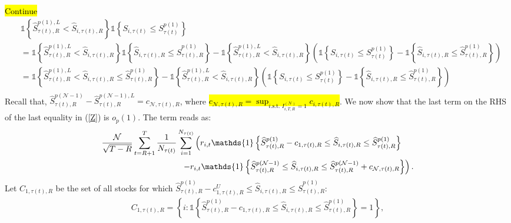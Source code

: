 \hl{Continue}
\begin{align*}
    &\mathds{1} \left\{  \widehat{S}_{\tau(t),R}^{p(1),L} < \widehat{S}_{i,\tau(t),R} \right\} \mathds{1} \left\{ S_{i,\tau(t)}\leq S_{\tau(t)}^{p(1)}\right\} \\
    &=\mathds{1} \left\{  \widehat{S}_{\tau(t),R}^{p(1),L} < \widehat{S}_{i,\tau(t),R} \right\} \mathds{1} \left\{ \widehat{S}_{i,\tau(t),R}\leq \widehat{S}_{\tau(t),R}^{p(1)}\right\} - \mathds{1} \left\{  \widehat{S}_{\tau(t),R}^{p(1),L} < \widehat{S}_{i,\tau(t),R} \right\} \left( \mathds{1} \left\{ S_{i,\tau(t)}\leq S_{\tau(t)}^{p(1)}\right\} - \mathds{1} \left\{ \widehat{S}_{i,\tau(t),R}\leq \widehat{S}_{\tau(t),R}^{p(1)}\right\} \right) \\
    &=\mathds{1} \left\{  \widehat{S}_{\tau(t),R}^{p(1),L} < \widehat{S}_{i,\tau(t),R} \leq \widehat{S}_{\tau(t),R}^{p(1)}\right\} - \mathds{1} \left\{  \widehat{S}_{\tau(t),R}^{p(1),L} < \widehat{S}_{i,\tau(t),R} \right\} \left( \mathds{1} \left\{ S_{i,\tau(t)}\leq S_{\tau(t)}^{p(1)}\right\} - \mathds{1} \left\{ \widehat{S}_{i,\tau(t),R}\leq \widehat{S}_{\tau(t),R}^{p(1)}\right\} \right) \\
\end{align*}
Recall that, $\widehat{S}_{\tau(t),R}^{p(\mathcal{N}-1)}-\widehat{S}_{\tau(t),R}^{p(\mathcal{N}-1),L}=c_{\mathcal{N},\tau(t),R}$, where \hl{$c_{\mathcal{N},\tau(t),R}=\sup_{i\text{.s.t. }I_{i,T,R}^{(\mathcal{N})}=1}c_{i,\tau(t),R}$}. We now show that the last term on the RHS of the last equality in (\ref{Z}) is $o_{p}(1).$ The term reads as:
\begin{align*}
    &\frac{\mathcal{N}}{\sqrt{T-R}}\sum_{t=R+1}^{T}\frac{1}{N_{\tau(t)}}\sum_{i=1}^{N_{\tau(t)}}\left( r_{i,t}\mathds{1} \left\{ \widehat{S}_{\tau(t),R}^{p(1)}-c_{1,\tau(t),R} \leq \widehat{S}_{i,\tau(t),R}\leq \widehat{S}_{\tau(t),R}^{p(1)}\right\} \right. \notag \\
    &\hspace{3.4cm} \left. -r_{i,t}\mathds{1} \left\{ \widehat{S}_{\tau(t),R}^{p(\mathcal{N}-1)} \leq \widehat{S}_{i,\tau(t),R}\leq \widehat{S}_{\tau(t),R}^{p(\mathcal{N}-1)}+c_{\mathcal{N},\tau(t),R} \right\} \right). \label{BTNR}
\end{align*}
Let $C_{1,\tau(t),R}$ be the set of all stocks for which $\widehat{S}_{\tau(t),R}^{p(1)}-c_{1,\tau(t) ,R}^{U}\leq \widehat{S}_{i,\tau(t),R}\leq \widehat{S}_{\tau(t),R}^{p(1)}$:
\begin{align*}
    C_{1,\tau(t),R}=\left\{ i:\mathds{1} \left\{ \widehat{S}_{\tau(t),R}^{p(1)}-c_{1,\tau(t),R} \leq \widehat{S}_{i,\tau(t),R}\leq \widehat{S}_{\tau(t),R}^{p(1)}\right\} =1\right\} ,
\end{align*}

